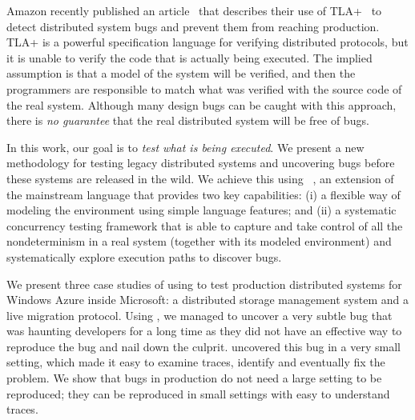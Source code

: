 Amazon recently published an article~\cite{newcombe2015aws} that describes their use of TLA+~\cite{lamport1994temporal} to detect distributed system bugs and prevent them from reaching production. TLA+ is a powerful specification language for verifying distributed protocols, but it is unable to verify the code that is actually being executed. The implied assumption is that a model of the system will be verified, and then the programmers are responsible to match what was verified with the source code of the real system. Although many design bugs can be caught with this approach, there is \emph{no guarantee} that the real distributed system will be free of bugs. 

In this work, our goal is to \emph{test what is being executed}. We present a new methodology for testing legacy distributed systems and uncovering bugs before these systems are released in the wild. We achieve this using \psharp~\cite{deligiannis2015psharp}, an extension of the mainstream language \csharp that provides two key capabilities: (i) a flexible way of modeling the environment using simple language features; and (ii) a systematic concurrency testing framework that is able to capture and take control of all the nondeterminism in a real system (together with its modeled environment) and systematically explore execution paths to discover bugs. 

We present three case studies of using \psharp to test production distributed systems for Windows Azure inside Microsoft: a distributed storage management system and a live migration protocol. Using \psharp, we managed to uncover a very subtle bug that was haunting developers for a long time as they did not have an effective way to reproduce the bug and nail down the culprit. \psharp uncovered this bug in a very small setting, which made it easy to examine traces, identify and eventually fix the problem. We show that bugs in production do not need a large setting to be reproduced; they can be reproduced in small settings with easy to understand traces.

